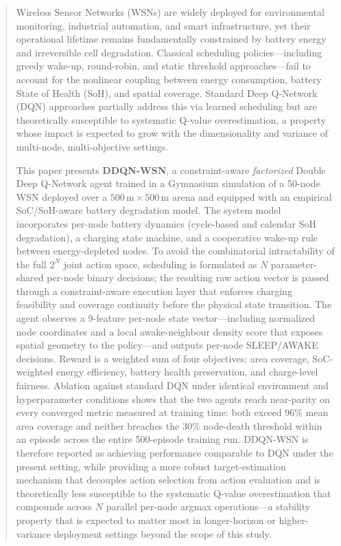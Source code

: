 \documentclass[journal]{IEEEtran}
\begin{document}
\begin{abstract}
Wireless Sensor Networks (WSNs) are widely deployed for environmental
monitoring, industrial automation, and smart infrastructure, yet their
operational lifetime remains fundamentally constrained by battery energy
and irreversible cell degradation. Classical scheduling
policies—including greedy wake-up, round-robin, and static threshold
approaches—fail to account for the nonlinear coupling between energy
consumption, battery State of Health (SoH), and spatial coverage.
Standard Deep Q-Network (DQN) approaches partially address this via
learned scheduling but are theoretically susceptible to systematic
Q-value overestimation, a property whose impact is expected to grow
with the dimensionality and variance of multi-node, multi-objective
settings.

This paper presents \textbf{DDQN-WSN}, a constraint-aware
\textit{factorized} Double Deep Q-Network agent trained in a Gymnasium
simulation of a 50-node WSN deployed over a
$500\,\text{m} \times 500\,\text{m}$ arena and equipped with an empirical
SoC/SoH-aware battery degradation model. The system model incorporates
per-node battery dynamics (cycle-based and calendar SoH degradation), a
charging state machine, and a cooperative wake-up rule between
energy-depleted nodes. To avoid the combinatorial intractability of the
full $2^N$ joint action space, scheduling is formulated as $N$
parameter-shared per-node binary decisions; the resulting raw action
vector is passed through a constraint-aware execution layer that enforces
charging feasibility and coverage continuity before the physical state
transition. The agent observes a 9-feature per-node state vector—including
normalized node coordinates and a local awake-neighbour density score
that exposes spatial geometry to the policy—and outputs per-node
SLEEP/AWAKE decisions. Reward is a weighted sum of four objectives:
area coverage, SoC-weighted energy efficiency, battery health
preservation, and charge-level fairness. Ablation against standard DQN under identical environment and
hyperparameter conditions shows that the two agents reach
near-parity on every converged metric measured at training time:
both exceed $96\%$ mean area coverage and neither breaches the $30\%$
node-death threshold within an episode across the entire 500-episode
training run. DDQN-WSN is therefore reported as achieving performance
comparable to DQN under the present setting, while providing a more
robust target-estimation mechanism that decouples action selection
from action evaluation and is theoretically less susceptible to the
systematic Q-value overestimation that compounds across $N$
parallel per-node argmax operations---a stability property that is
expected to matter most in longer-horizon or higher-variance
deployment settings beyond the scope of this study.
\end{abstract}
\end{document}
